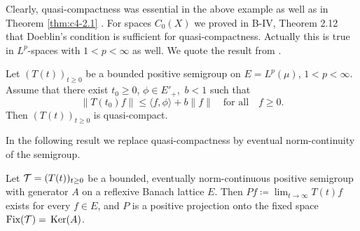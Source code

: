 Clearly, quasi-compactness was essential in the above example as well as in Theorem \ref{thm:c4-2.1} .
For spaces $C_{0}(X)$ we proved in B-IV, Theorem 2.12 that Doeblin's condition is sufficient for quasi-compactness.
Actually this is true in $L^{p}$-spaces with $1 < p < \infty$ as well.
We quote the result from \citet{lotz:1986}.

\begin{proposition}\label{prop:c4-2.4}
Let $(T(t))_{t \geq 0}$ be a bounded positive semigroup on $E = L^{p}(\mu)$, $1 < p < \infty$.
Assume that there exist $t_{0} \geq 0$, $\phi \in E'_{+}$,\, $b < 1$ such that
\begin{equation}\label{eq:c4-2.4}
\|T(t_{0})f\| \leq \langle f,\phi \rangle + b\|f\| \quad \text{for all} \quad f \geq 0.
\end{equation}
Then $(T(t))_{t \geq 0}$ is quasi-compact.
\end{proposition}

In the following result we replace quasi-compactness by eventual norm-continuity of the semigroup.

\begin{theorem} \label{thm:c4-2.5}
Let $\mathcal{T} = (T(t))_{t \geq 0}$ be a bounded, eventually norm-continuous positive semigroup with generator $A$ on a reflexive Banach lattice $E$.
Then $Pf \coloneqq  \lim_{t \to \infty} T(t)f$ exists for every $f \in E$, and
$P$ is a positive projection onto the fixed space $\text{Fix}(\mathcal{T}) = \mathop{}\mathrm{Ker}(A)$. 
\end{theorem}


